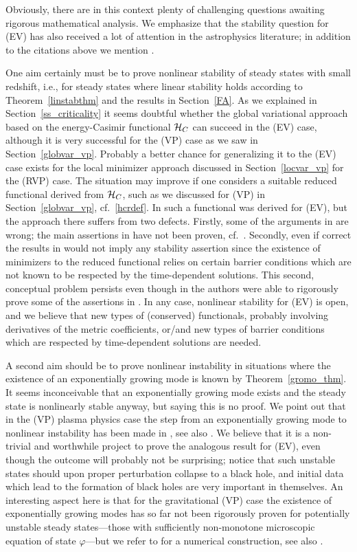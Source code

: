 \documentclass[11pt]{article}
\begin{document}
Obviously, there are in this context plenty of challenging questions
awaiting rigorous mathematical analysis. We emphasize that the
stability question for (EV) has also received a lot of attention
in the astrophysics literature; in addition to the citations above
we mention \cite{FaIpTh,FaSu1976a,FaSu1976b,KaHoKl1975,Th1966}.

One aim certainly must be to prove nonlinear stability
of steady states with small redshift, i.e., for steady states where
linear stability holds according to Theorem~\ref{linstabthm} and the results
in Section~\ref{FA}. As we explained in Section~\ref{ss_criticality}
it seems doubtful whether the global variational approach based
on the energy-Casimir functional ${\cal H}_C$ can succeed in the
(EV) case, although it is very
successful for the (VP) case as we saw in Section~\ref{globvar_vp}.
Probably a better chance for generalizing
it to the (EV) case exists for the local minimizer approach discussed
in Section~\ref{locvar_vp} for the (RVP) case. The situation may improve 
if one considers a suitable reduced functional derived from ${\cal H}_C$,
such as we discussed for (VP) in Section~\ref{globvar_vp}, cf.~\eqref{hcrdef}.
In \cite{Wo} such a functional was derived for (EV), but the approach
there suffers from two defects. Firstly, some of the arguments in
\cite{Wo} are wrong; the main assertions in \cite{Wo} have not been proven,
cf.~\cite{AnKu20}. Secondly, even if correct the results in
\cite{Wo} would not imply any stability assertion since the
existence of minimizers to the reduced functional relies on certain
barrier conditions which are not known to be respected by the time-dependent
solutions. This second, conceptual problem persists even though in
\cite{AnKu} the authors were able to rigorously prove some of the assertions
in \cite{Wo}. In any case, nonlinear stability for (EV) is open, and we
believe that new types of (conserved) functionals, probably
involving derivatives of the metric coefficients, or/and new
types of barrier conditions which are respected by time-dependent 
solutions are needed.

A second aim should be to prove nonlinear instability in situations
where the existence of an exponentially growing mode is known by
Theorem~\ref{gromo_thm}. It seems inconceivable that
an exponentially growing mode exists and the steady state is nonlinearly
stable anyway, but saying this is no proof. We point out that in
the (VP) plasma physics case the step from an exponentially
growing mode to nonlinear
instability has been made in \cite{GStr}, see also \cite{FrStrVi}.
We believe that it is a non-trivial and worthwhile project to
prove the analogous result for (EV), even though the outcome will
probably not be surprising; notice that such unstable states
should upon proper perturbation collapse to a black hole,
and initial data which lead to the formation of black holes
are very important in themselves.
An interesting aspect here is that for the gravitational (VP) case
the existence of exponentially growing modes has so far not
been rigorously proven for potentially unstable steady
states---those with sufficiently non-monotone microscopic
equation of state $\varphi$---but we refer to \cite{WaGuoea} for a numerical
construction, see also \cite{GuoLin}.
\end{document}
